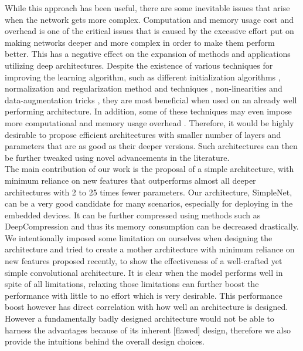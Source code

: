 \documentclass{article} \usepackage{lets_keepit_simple,times}
\begin{document}
While this approach has been useful, there are some inevitable issues that arise when the network gets more complex. Computation and memory usage cost and overhead is one of the critical issues that is caused by the excessive effort put on making networks deeper and more complex in order to make them perform better. This has a negative effect on the expansion of methods and applications utilizing deep architectures. Despite the existence of various techniques for improving the learning algorithm, such as different initialization algorithms \cite{Glorot_Xavier_Understanding_difficulty_training_dnn_2010, He_PReLU_2015, Hinton_Distillation_2015, Mishkin_AllYouNeedIsGoodInit_2015, Saxe_ExactSolution_2013}, normalization and regularization method and techniques \cite{Graham_FractionalMaxpooling_2014, Goodfellow_MaxoutNetwork_2013, Ioffe_BatchNorm_incepv2_2015, Wager_dropout_training_2013, Wan_Regularization_Using_DropConnect_2013}, non-linearities \cite{Clevert_Fast_n_accurat_ELU_2015, He_PReLU_2015, Maas_RectifierNonlinearities_2013, Nair_ReLU_RBM_2010} and data-augmentation tricks \cite{AlexKrizhevsky_imgnet_2012, Graham_FractionalMaxpooling_2014, Simonyan_VGG_2014, Wu_deepImage_2015, Xu_EmpiricalEvalRectified_2015}, they are most beneficial when used on an already well performing architecture. In addition, some of these techniques may even impose more computational and memory usage overhead \cite{Goodfellow_MaxoutNetwork_2013, Ioffe_BatchNorm_incepv2_2015}. Therefore, it would be highly desirable to propose efficient architectures with smaller number of layers and parameters that are as good as their deeper versions. Such architectures can then be further tweaked using novel advancements in the literature.\\ 
The main contribution of our work is the proposal of a simple architecture, with minimum reliance on new features that outperforms almost all deeper architectures with 2 to 25 times fewer parameters. Our architecture, SimpleNet, can be a very good candidate for many scenarios, especially for deploying in the embedded devices. It can be further compressed using methods such as DeepCompression \cite{Han_deep_compression_2015} and thus its memory consumption can be decreased drastically.\\
We intentionally imposed some limitation on ourselves when designing the architecture and tried to create a mother architecture with minimum reliance on new features proposed recently, to show the effectiveness of a well-crafted yet simple convolutional architecture. It is clear when the model performs well in spite of all limitations, relaxing those limitations can further boost the performance with little to no effort which is very desirable. This performance boost however has direct correlation with how well an architecture is designed. However a fundamentally badly designed architecture would not be able to harness the advantages because of its inherent [flawed] design,  therefore we also provide the intuitions behind the overall design choices.\\
\end{document}
